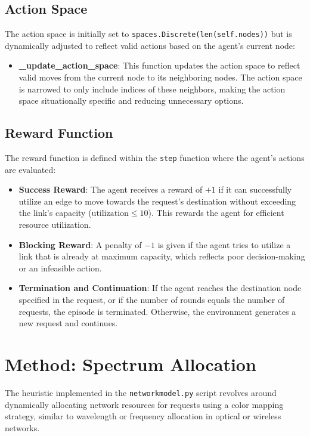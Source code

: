 \documentclass[conference]{IEEEtran}
\begin{document}
\subsection{Action Space}

The action space is initially set to \texttt{spaces.Discrete(len(self.nodes))} but is dynamically adjusted to reflect valid actions based on the agent's current node:

\begin{itemize}
    \item \textbf{\_update\_action\_space}: This function updates the action space to reflect valid moves from the current node to its neighboring nodes. The action space is narrowed to only include indices of these neighbors, making the action space situationally specific and reducing unnecessary options.
\end{itemize}

\subsection{Reward Function}


The reward function is defined within the \texttt{step} function where the agent's actions are evaluated:
\begin{itemize}
    \item \textbf{Success Reward}: The agent receives a reward of \(+1\) if it can successfully utilize an edge to move towards the request's destination without exceeding the link’s capacity (\(\text{utilization} \leq 10\)). This rewards the agent for efficient resource utilization.
    \item \textbf{Blocking Reward}: A penalty of \(-1\) is given if the agent tries to utilize a link that is already at maximum capacity, which reflects poor decision-making or an infeasible action.
    \item \textbf{Termination and Continuation}: If the agent reaches the destination node specified in the request, or if the number of rounds equals the number of requests, the episode is terminated. Otherwise, the environment generates a new request and continues.
\end{itemize}

\section{Method: Spectrum Allocation}
The heuristic implemented in the \texttt{networkmodel.py} script revolves around dynamically allocating network resources for requests using a color mapping strategy, similar to wavelength or frequency allocation in optical or wireless networks.
\end{document}
